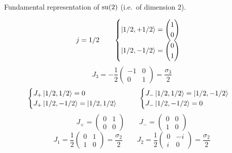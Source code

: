 \begin{example}
Fundamental representation of $\operatorname{su}(2)$ (i.e.\ of dimension $2$).

\[ j=1/2 \qquad \begin{cases}
\left| 1/2,+1/2 \right\rangle = \begin{pmatrix} 1 \\ 0 \end{pmatrix} \\
\left| 1/2,-1/2 \right\rangle = \begin{pmatrix} 0 \\ 1 \end{pmatrix}
\end{cases} \]
\[ J_3 = - \frac{1}{2} \begin{pmatrix}
-1 & 0 \\ 0 & 1
\end{pmatrix} = \frac{\sigma_3}{2} \]
\[ \begin{cases}
J_+\left| 1/2, 1/2 \right\rangle = 0 \\ J_+\left| 1/2, -1/2 \right\rangle = \left| 1/2,1/2 \right\rangle
\end{cases} \qquad \begin{cases}
J_-\left| 1/2, 1/2 \right\rangle = \left| 1/2,-1/2 \right\rangle \\ J_-\left| 1/2, -1/2 \right\rangle = 0
\end{cases} \]
\[J_+ = \begin{pmatrix}
0&1\\0&0
\end{pmatrix} \qquad J_- = \begin{pmatrix}
0&0\\1&0
\end{pmatrix}\]
\[ J_1 = \frac{1}{2}\begin{pmatrix}
0&1\\1&0
\end{pmatrix} = \frac{\sigma_2}{2} \qquad J_2 = \frac{1}{2} \begin{pmatrix}
0&-i\\i&0
\end{pmatrix} = \frac{\sigma_2}{2}\]
\end{example}

